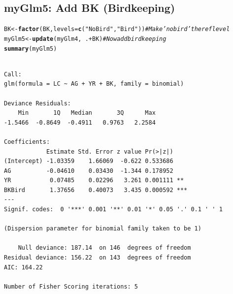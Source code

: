 \documentclass[oneside]{book}\usepackage[]{graphicx}\usepackage[svgnames]{xcolor}
\makeatletter
\newcommand{\hlstr}[1]{\textcolor[rgb]{0.192,0.494,0.8}{#1}}%
\newcommand{\hlcom}[1]{\textcolor[rgb]{0.678,0.584,0.686}{\textit{#1}}}%
\newcommand{\hlopt}[1]{\textcolor[rgb]{0,0,0}{#1}}%
\newcommand{\hlstd}[1]{\textcolor[rgb]{0.345,0.345,0.345}{#1}}%
\newcommand{\hlkwb}[1]{\textcolor[rgb]{0.69,0.353,0.396}{#1}}%
\newcommand{\hlkwc}[1]{\textcolor[rgb]{0.333,0.667,0.333}{#1}}%
\newcommand{\hlkwd}[1]{\textcolor[rgb]{0.737,0.353,0.396}{\textbf{#1}}}%
\newenvironment{kframe}{%
 \def\at@end@of@kframe{}%
 \ifinner\ifhmode%
  \def\at@end@of@kframe{\end{minipage}}%
  \begin{minipage}{\columnwidth}%
 \fi\fi%
 \def\FrameCommand##1{\hskip\@totalleftmargin \hskip-\fboxsep
 \colorbox{shadecolor}{##1}\hskip-\fboxsep
     \hskip-\linewidth \hskip-\@totalleftmargin \hskip\columnwidth}%
 \MakeFramed {\advance\hsize-\width
   \@totalleftmargin\z@ \linewidth\hsize
   \@setminipage}}%
 {\par\unskip\endMakeFramed%
 \at@end@of@kframe}
\newenvironment{knitrout}{}{} %
\makeatother
\begin{document}
\subsection*{myGlm5: Add BK (Birdkeeping)}
\begin{knitrout}
\color{fgcolor}\begin{kframe}
\begin{alltt}
\hlstd{BK} \hlkwb{<-} \hlkwd{factor}\hlstd{(BK,} \hlkwc{levels} \hlstd{=} \hlkwd{c}\hlstd{(}\hlstr{"NoBird"}\hlstd{,} \hlstr{"Bird"}\hlstd{))}  \hlcom{# Make 'no bird' the ref level}
\hlstd{myGlm5} \hlkwb{<-} \hlkwd{update}\hlstd{(myGlm4,} \hlopt{~}\hlstd{.} \hlopt{+} \hlstd{BK)}  \hlcom{# Now add bird keeping}
\hlkwd{summary}\hlstd{(myGlm5)}
\end{alltt}
\begin{verbatim}

Call:
glm(formula = LC ~ AG + YR + BK, family = binomial)

Deviance Residuals: 
    Min       1Q   Median       3Q      Max  
-1.5466  -0.8649  -0.4911   0.9763   2.2584  

Coefficients:
            Estimate Std. Error z value Pr(>|z|)    
(Intercept) -1.03359    1.66069  -0.622 0.533686    
AG          -0.04610    0.03430  -1.344 0.178952    
YR           0.07485    0.02296   3.261 0.001111 ** 
BKBird       1.37656    0.40073   3.435 0.000592 ***
---
Signif. codes:  0 '***' 0.001 '**' 0.01 '*' 0.05 '.' 0.1 ' ' 1

(Dispersion parameter for binomial family taken to be 1)

    Null deviance: 187.14  on 146  degrees of freedom
Residual deviance: 156.22  on 143  degrees of freedom
AIC: 164.22

Number of Fisher Scoring iterations: 5
\end{verbatim}
\end{kframe}
\end{knitrout}
\end{document}
